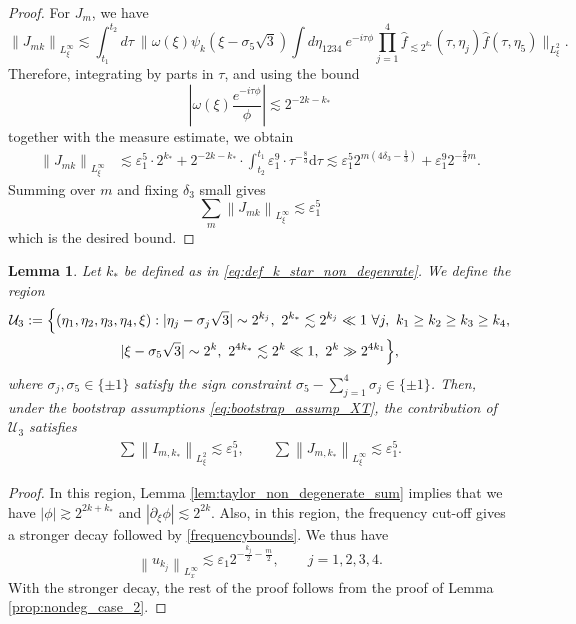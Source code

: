 \documentclass[reqno,english,11pt]{amsart}
\newcommand{\eps}{\varepsilon}
\newcommand{\snorm}[1]{\left\|#1\right\|}
\newtheorem{lemma}[theorem]{Lemma}
\theoremstyle{definition}
\numberwithin{equation}{section}
\begin{document}
\begin{proof}
For $J_m$, we have
\begin{equation*}
    \snorm{J_{mk}}_{L^\infty_\xi}\lesssim \int_{t_1}^{t_2}d \tau \ \Bigg\|\omega(\xi)\psi_{k}\left(\xi-\sigma_5 \sqrt{3}\right)\int d\eta_{1234} \ e^{-i\tau\phi}\prod^4_{j=1}\widehat{f}_{\lesssim 2^{k_{*}}} \left(\tau,\eta_{j}\right)
    \widehat{f}\left(\tau,\eta_5\right)\Bigg\|_{L^2_\xi}.
\end{equation*}    
Therefore, integrating by parts in $\tau$, and using the bound
$$\left|\omega(\xi)\frac{e^{-i\tau\phi}}{\phi}\right|\lesssim 2^{-2k-k_*}$$
together with the measure estimate, we obtain
\begin{align*}
     \snorm{J_{mk}}_{L^\infty_\xi}&\lesssim \eps_1^5\cdot 2^{k_*}+2^{-2k-k_*}
     \cdot\int_{t_2}^{t_1} \eps_1^9 \cdot \tau^{-\frac{8}{3}}\mathrm{d}\tau \lesssim \eps_1^5 2^{m(4\delta_3-\frac{1}{3})}+\eps_1^9 2^{-\frac{2}{3}m}.
\end{align*}
Summing over $m$ and fixing $\delta_3$ small gives
$$\sum_{m} \snorm{J_{mk}}_{L^\infty_\xi} \lesssim \eps_1^5$$
which is the desired bound.
\end{proof}
\begin{lemma}\label{prop:non_deg_case_3}
Let $k_*$ be defined as in \eqref{eq:def_k_star_non_degenrate}.
We define the region
\begin{multline*}
\mathcal{U}_{3}:=\Bigl\{(\eta_1,\eta_2,\eta_3,\eta_4,\xi):|\eta_j-\sigma_j\sqrt{3}|\sim 2^{k_j},\ 2^{k_*}\lesssim 2^{k_j}\ll 1 \ \forall j,\ k_1\ge k_2\ge k_3\ge k_4,\\
|\xi-\sigma_5\sqrt{3}|\sim 2^{k},\
2^{4k_*}\lesssim 2^{k}\ll 1,\
2^{k}\gg 2^{4k_1}
\Bigr\},
\end{multline*}
where $\sigma_j,\sigma_5\in\{\pm1\}$ satisfy the sign constraint
$\sigma_5-\sum_{j=1}^4\sigma_j\in\{\pm1\}$.
Then, under the bootstrap assumptions \eqref{eq:bootstrap_assump_XT}, the contribution of $\mathcal{U}_3$ satisfies
    \begin{align*}
        \sum\snorm{I_{m,k_*}}_{L^2_\xi}\lesssim \eps_1^5,\qquad \sum\snorm{J_{m,k_*}}_{L^\infty_\xi}\lesssim \eps_1^5.
    \end{align*}    
\end{lemma}
\begin{proof}
In this region, Lemma \ref{lem:taylor_non_degenerate_sum} implies that we have $|\phi|\gtrsim 2^{2k+k_*}$ and $|\partial_\xi \phi|\lesssim 2^{2k}$. Also, in this region, the frequency cut-off gives a stronger decay followed by \eqref{frequencybounds}. We thus have 
$$\snorm{u_{k_j}}_{L^\infty_x}\lesssim \eps_1 2^{-\frac{k_j}{2}-\frac{m}{2}},\qquad j=1,2,3,4.$$
With the stronger decay, the rest of the proof follows from the proof of Lemma  \ref{prop:nondeg_case_2}.
\end{proof}
\end{document}

